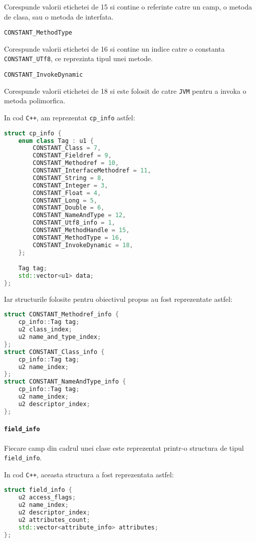 Corespunde valorii etichetei de 15 si contine o referinte catre un camp,
o metoda de clasa, sau o metoda de interfata.

\texttt{CONSTANT\_MethodType}

Corespunde valorii etichetei de 16 si contine un indice catre o
constanta \texttt{CONSTANT\_UTf8}, ce reprezinta tipul unei metode.

\texttt{CONSTANT\_InvokeDynamic}

Corespunde valorii etichetei de 18 si este folosit de catre \texttt{JVM}
pentru a invoka o metoda polimorfica.

In cod \texttt{C++}, am reprezentat \texttt{cp\_info} astfel:

\begin{lstlisting}[language=C++]
struct cp_info {
    enum class Tag : u1 {
        CONSTANT_Class = 7,
        CONSTANT_Fieldref = 9,
        CONSTANT_Methodref = 10,
        CONSTANT_InterfaceMethodref = 11,
        CONSTANT_String = 8,
        CONSTANT_Integer = 3,
        CONSTANT_Float = 4,
        CONSTANT_Long = 5,
        CONSTANT_Double = 6,
        CONSTANT_NameAndType = 12,
        CONSTANT_Utf8_info = 1,
        CONSTANT_MethodHandle = 15,
        CONSTANT_MethodType = 16,
        CONSTANT_InvokeDynamic = 18,
    };

    Tag tag;
    std::vector<u1> data;
};
\end{lstlisting}

Iar structurile folosite pentru obiectivul propus au fost reprezentate
astfel:

\begin{lstlisting}[language=C++]
struct CONSTANT_Methodref_info {
    cp_info::Tag tag;
    u2 class_index;
    u2 name_and_type_index;
};
struct CONSTANT_Class_info {
    cp_info::Tag tag;
    u2 name_index;
};
struct CONSTANT_NameAndType_info {
    cp_info::Tag tag;
    u2 name_index;
    u2 descriptor_index;
};
\end{lstlisting}

\paragraph{\texorpdfstring{\texttt{field\_info}}{field\_info}}\label{field_info}

Fiecare camp din cadrul unei clase este reprezentat printr-o structura
de tipul \texttt{field\_info}.

In cod \texttt{C++}, aceasta structura a fost reprezentata astfel:

\begin{lstlisting}[language=C++]
struct field_info {
    u2 access_flags;
    u2 name_index;
    u2 descriptor_index;
    u2 attributes_count;
    std::vector<attribute_info> attributes;
};
\end{lstlisting}

